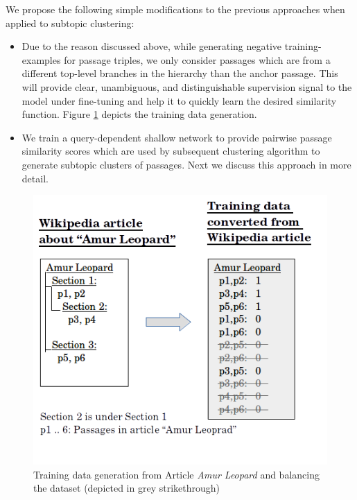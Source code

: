We propose the following simple modifications to the previous approaches when applied to subtopic clustering:
\begin{itemize}[leftmargin=.15in]
    \item Due to the reason discussed above, while generating negative training-examples for passage triples, we only consider passages which are from a different top-level branches in the hierarchy than the anchor passage. This will provide clear, unambiguous, and distinguishable supervision signal to the model under fine-tuning and help it to quickly learn the desired similarity function. Figure \ref{fig:conv} depicts the training data generation.
    \item We train a query-dependent shallow network to provide pairwise passage similarity scores which are used by subsequent clustering algorithm to generate subtopic clusters of passages. Next we discuss this approach in more detail.
\end{itemize}{}
\begin{figure}[h]
  \centering
  \includegraphics[width=\linewidth]{graphics/car_y1_conv.png}
  \caption{Training data generation from Article \textit{Amur Leopard} and balancing the dataset (depicted in grey strikethrough)}
  \label{fig:conv}
\end{figure}

